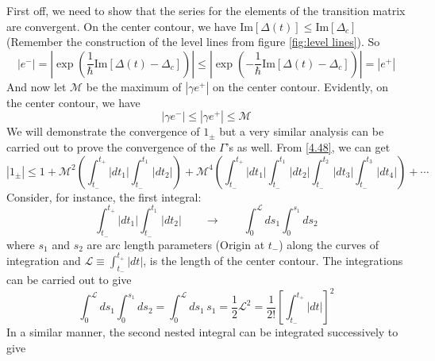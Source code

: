\documentclass[12pt,a4paper]{article}
\begin{document}
	First off, we need to show that the series for the elements of the transition matrix are convergent. On the center contour, we have $\mathrm{Im}[\Delta(t)] \leq \mathrm{Im}[\Delta_{c}]$ (Remember the construction of the level lines from figure \ref{fig:level lines}). So
	\begin{equation}
		\left| e^{-} \right| = \left| \exp\left( \dfrac{1}{\hbar} \mathrm{Im}[\Delta(t) - \Delta_{c}] \right) \right| \leq \left| \exp\left( -\dfrac{1}{\hbar} \mathrm{Im}[\Delta(t) - \Delta_{c}] \right) \right| = 	\left| e^{+} \right| \label{4.51}
	\end{equation}
	And now let $\mathcal{M}$ be the maximum of $\left| \gamma e^{+} \right|$ on the center contour. Evidently, on the center contour, we have
	\begin{equation}
		\left| \gamma e^{-} \right| \leq \left| \gamma e^{+} \right| \leq \mathcal{M} \label{4.52}
	\end{equation}
	We will demonstrate the convergence of $1_{\pm}$ but a very similar analysis can be carried out to prove the convergence of the $\Gamma$'s as well. From \eqref{4.48}, we can get
	\begin{equation}
		\left| 1_{\pm} \right| \leq 1 + \mathcal{M}^{2} \left( \int_{t_{-}}^{t_{+}} \left| dt_{1} \right| \int_{t_{-}}^{t_{1}} \left| dt_{2} \right| \right) + \mathcal{M}^{4} \left( \int_{t_{-}}^{t_{+}} \left| dt_{1} \right| \int_{t_{-}}^{t_{1}} \left| dt_{2} \right| \int_{t_{-}}^{t_{2}} \left| dt_{3} \right| \int_{t_{-}}^{t_{3}} \left| dt_{4} \right| \right) + \cdots \label{4.53}
	\end{equation}
	Consider, for instance, the first integral:
	\begin{equation}
		\int_{t_{-}}^{t_{+}} \left| dt_{1} \right| \int_{t_{-}}^{t_{1}} \left| dt_{2} \right| \qquad \rightarrow \qquad \int_{0}^{\mathcal{L}} ds_{1} \int_{0}^{s_{1}} ds_{2}
	\end{equation}
	where $s_{1}$ and $s_{2}$ are arc length parameters (Origin at $t_{-}$) along the curves of integration and $\mathcal{L} \equiv \int_{t_{-}}^{t_{+}} \left| dt \right|$, is the length of the center contour. The integrations can be carried out to give
	\begin{equation}
		\int_{0}^{\mathcal{L}} ds_{1} \int_{0}^{s_{1}} ds_{2} = \int_{0}^{\mathcal{L}} ds_{1}\, s_{1} = \dfrac{1}{2} \mathcal{L}^{2} = \dfrac{1}{2!} \left[ \int_{t_{-}}^{t_{+}} \left| dt \right| \right]^{2}
	\end{equation}
	In a similar manner, the second nested integral can be integrated successively to give
\end{document}
